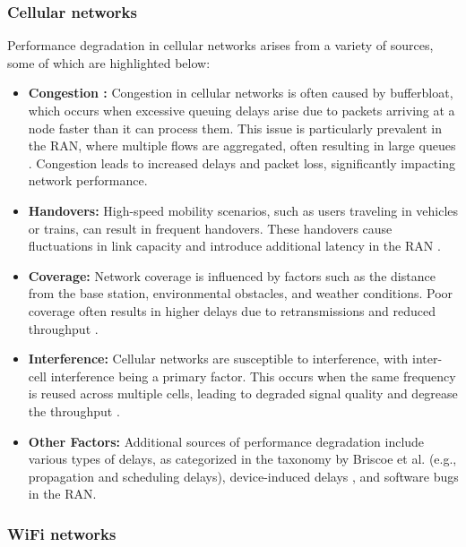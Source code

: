 \subsubsection{Cellular networks}
Performance degradation in cellular networks arises from a variety of sources, some of which are highlighted below:
\begin{itemize}
    \item \textbf{Congestion :} Congestion in cellular networks is often caused by bufferbloat, which occurs when excessive queuing delays arise due to packets arriving at a node faster than it can process them. This issue is particularly prevalent in the \ac{RAN}, where multiple flows are aggregated, often resulting in large queues \cite{ronteix2022reduction, zhang2019analysis}. Congestion leads to increased delays and packet loss, significantly impacting network performance.
    \item \textbf{Handovers:}  
    High-speed mobility scenarios, such as users traveling in vehicles or trains, can result in frequent handovers. These handovers cause fluctuations in link capacity and introduce additional latency in the RAN \cite{tan2018supporting, pan2022first, xu2020understanding}.  
    
    \item \textbf{Coverage:}  
    Network coverage is influenced by factors such as the distance from the base station, environmental obstacles, and weather conditions. Poor coverage often results in higher delays due to retransmissions and reduced throughput \cite{pan2022first}.  
    
    \item \textbf{Interference:}  
    Cellular networks are susceptible to interference, with inter-cell interference being a primary factor. This occurs when the same frequency is reused across multiple cells, leading to degraded signal quality and degrease the throughput \cite{zhou2014overview}.  
    
    \item \textbf{Other Factors:}  
    Additional sources of performance degradation include various types of delays, as categorized in the taxonomy by Briscoe et al. \cite{briscoe2014reducing} (e.g., propagation and scheduling delays), device-induced delays \cite{Kmrinen2017AMS}, and software bugs in the RAN.  
\end{itemize}

\subsubsection{WiFi networks}

